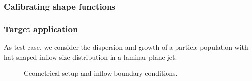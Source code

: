 \documentclass[10pt,xcolor=dvipsnames]{beamer}
\begin{document}
\begin{frame}[t]

  \frametitle{Calibrating shape functions}

  \newcommand{\snapf}{\left(\begin{array}{@{}c>{\columncolor{black!10}}cc@{}} F_1(\tau_1) &F_2(\tau_1) &\cdots \\ F_1(\tau_2) &F_2(\tau_2) &\cdots \\ \vdots &\vdots &\ddots \end{array}\right)}
  \newcommand{\snapv}{\left(\begin{array}{@{}c>{\columncolor{black!10}}cc@{}} \bar{l}_1(\tau_1) &\bar{l}_2(\tau_1) &\cdots \\ \bar{l}_1(\tau_2) &\bar{l}_2(\tau_2) &\cdots \\ \vdots &\vdots &\ddots \end{array}\right)}
  \newcommand{\vecphi}{\left(\begin{array}{@{}c>{\columncolor{black!10}}cc@{}}\phi_1(\tau_1) &\phi_2(\tau_1) &\cdots \\ \phi_1(\tau_2) &\phi_2(\tau_2) &\cdots \\ \vdots &\vdots &\ddots \end{array}\right)}
  \newcommand{\vecpsi}{\left(\begin{array}{@{}cc@{}}\psi_1(\tau_1) &\cdots \\ \psi_1(\tau_2) &\cdots \\ \vdots &\ddots \end{array}\right)}
  \resizebox{\columnwidth}{!}{}

\end{frame}


\begin{frame}[t]

  \frametitle{Target application}

  \justifying As test case, we consider the dispersion and growth of a particle population with hat-shaped inflow size distribution in a laminar plane jet.
  \vspace{-0.5\baselineskip}

  \begin{figure}
  \begin{center}
  \resizebox{\columnwidth}{!}{}
  \caption[Geometrical setup of a laminar plane jet test case]{Geometrical setup and inflow boundary conditions.}
  \label{fig:setup}
  \end{center}
  \end{figure}

\end{frame}
\end{document}
